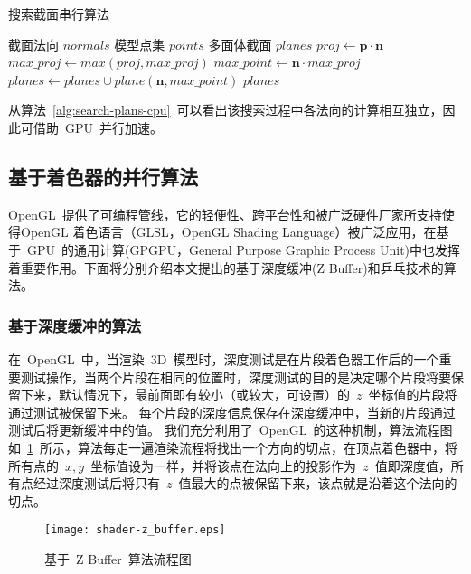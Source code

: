\begin{algorithm}[htbp]
\small
\caption{搜索截面串行算法}
\label{alg:search-plans-cpu}
\begin{algorithmic}[1]
\Require
截面法向 $normals$
模型点集 $points$
\Ensure
多面体截面 $planes$
          \State $proj \gets  \bm{p} \cdot \bm{n}$ 
          \State $max\_proj \gets max(proj, max\_proj)$ 
      \EndFor
  \EndFor
      \State $max\_point \gets \bm{n} \cdot max\_proj$ 
      \State $planes\gets planes \cup plane(\bm{n}, max\_point)$ 
  \EndFor
  \State \Return $planes$
\EndFunction
\end{algorithmic}
\end{algorithm}

从算法~\ref{alg:search-plans-cpu}~可以看出该搜索过程中各法向的计算相互独立，因此可借助~GPU~并行加速。

\subsection{基于着色器的并行算法}
\label{subsec:determ-normals-by-shader}

OpenGL~提供了可编程管线，它的轻便性、跨平台性和被广泛硬件厂家所支持使得OpenGL
着色语言（GLSL，OpenGL Shading Language）被广泛应用，在基于~GPU~的通用计算(GPGPU，General
Purpose Graphic Process Unit)中也发挥着重要作用。下面将分别介绍本文提出的基于深度缓冲(Z Buffer)和乒乓技术的算法。

\subsubsection{基于深度缓冲的算法}
	
在~OpenGL~中，当渲染~3D~模型时，深度测试是在片段着色器工作后的一个重要测试操作，当两个片段在相同的位置时，深度测试的目的是决定哪个片段将要保留下来，默认情况下，最前面即有较小（或较大，可设置）的~$z$~坐标值的片段将通过测试被保留下来。
每个片段的深度信息保存在深度缓冲中，当新的片段通过测试后将更新缓冲中的值。
我们充分利用了~OpenGL~的这种机制，算法流程图如~\ref{fig:flowchart:zbuffer}~所示，算法每走一遍渲染流程将找出一个方向的切点，在顶点着色器中，将所有点的~$x,y$~坐标值设为一样，并将该点在法向上的投影作为~$z$~值即深度值，所有点经过深度测试后将只有~$z$~值最大的点被保留下来，该点就是沿着这个法向的切点。

\begin{figure}[htbp]
  \centering
  \texttt{[image: shader-z\_buffer.eps]}
  \caption{基于~Z Buffer~算法流程图}
  \label{fig:flowchart:zbuffer}
\end{figure}

